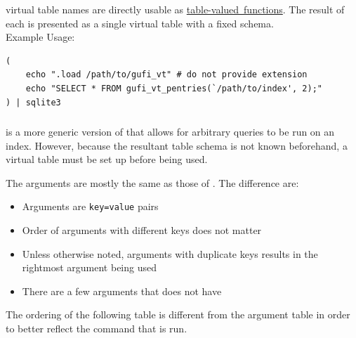 \gufivtstar virtual table names are directly usable as
\href{https://www.sqlite.org/vtab.html#tabfunc2}{table-valued~functions}. The
result of each \gufivtstar is presented as a single \sqlite virtual table with a
fixed schema. \\

Example Usage:
\begin{verbatim}
(
    echo ".load /path/to/gufi_vt" # do not provide extension
    echo "SELECT * FROM gufi_vt_pentries(`/path/to/index', 2);"
) | sqlite3
\end{verbatim}

\subsubsection{\gufivt}
\indent \gufivt is a more generic version of \gufivtstar that allows
for arbitrary queries to be run on an index. However, because the
resultant table schema is not known beforehand, a virtual table must
be set up before being used.

The \gufivt arguments are mostly the same as those of \gufivtstar. The
difference are:

\begin{itemize}
\item Arguments are \texttt{key=value} pairs
\item Order of arguments with different keys does not matter
\item Unless otherwise noted, arguments with duplicate keys results in
  the rightmost argument being used
\item There are a few arguments that \gufivtstar does not have
\end{itemize}

The ordering of the following table is different from the \gufivtstar
argument table in order to better reflect the command that is run.

